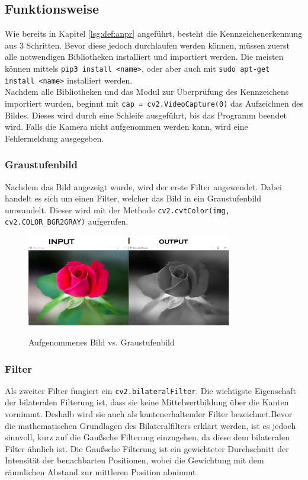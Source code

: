 \subsection{Funktionsweise}
Wie bereits in Kapitel \ref{lsg:def:anpr} angeführt, besteht die Kennzeichenerkennung aus 3 Schritten. Bevor diese jedoch durchlaufen werden können, müssen zuerst alle notwendigen Bibliotheken installiert und importiert werden. Die meisten können mittels \verb|pip3 install <name>|, oder aber auch mit \verb|sudo apt-get install <name>| installiert werden. \\
Nachdem alle Bibliotheken und das Modul zur Überprüfung des Kennzeichens importiert wurden, beginnt mit \verb|cap = cv2.VideoCapture(0)| das Aufzeichnen des Bildes. Dieses wird durch eine Schleife ausgeführt, bis das Programm beendet wird. Falls die Kamera nicht aufgenommen werden kann, wird eine Fehlermeldung ausgegeben.
\subsubsection{Graustufenbild}
Nachdem das Bild angezeigt wurde, wird der erste Filter angewendet. Dabei handelt es sich um einen Filter, welcher das Bild in ein Graustufenbild umwandelt. Dieser wird  mit der Methode \verb|cv2.cvtColor(img, cv2.COLOR_BGR2GRAY)| aufgerufen.
\begin{figure}[H]
\centering
\includegraphics[width=0.8\textwidth]{pics/Color2Gray.PNG}
\caption{Aufgenommenes Bild vs. Graustufenbild}
\cite{grayscaleImage}
\label{fig:anpr_1}
\end{figure}

\subsubsection{Filter}
Als zweiter Filter fungiert ein \verb|cv2.bilateralFilter|. Die wichtigste Eigenschaft der bilateralen Filterung ist, dass sie keine Mittelwertbildung über die Kanten vornimmt. Deshalb wird sie auch als kantenerhaltender Filter bezeichnet.Bevor  die mathematischen Grundlagen des Bilateralfilters erklärt werden, ist es jedoch sinnvoll, kurz auf die Gaußsche Filterung einzugehen, da diese dem bilateralen Filter ähnlich ist.
Die Gaußsche Filterung ist ein gewichteter Durchschnitt der Intensität der benachbarten Positionen, wobei die Gewichtung mit dem räumlichen Abstand zur mittleren Position abnimmt.

